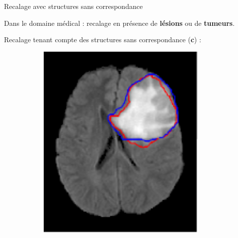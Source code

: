 \documentclass[10pt]{beamer}
\begin{document}
\begin{frame}{Recalage avec structures sans correspondance}


  Dans le domaine médical : recalage en présence de \textbf{lésions} ou de \textbf{tumeurs}.

  Recalage tenant compte des structures sans correspondance (\textbf{c}) \cite{Parisot_2012} :
  \begin{figure}[ht]
  \centering
  \begin{subfigure}[t]{0.33\textwidth}
    \centering \includegraphics[width=0.9\textwidth]{fig/parisot_0}
    \caption{}
    \label{subfig:parisot_0}
  \end{subfigure}%
  \begin{subfigure}[t]{0.33\textwidth}

\end{subfigure}
\end{figure}
\end{frame}
\end{document}
